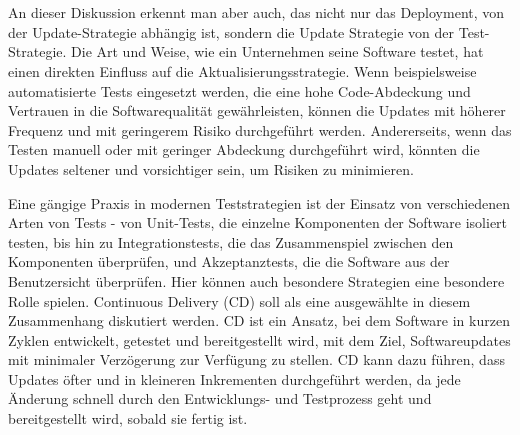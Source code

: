 \\\\ 
An dieser Diskussion erkennt man aber auch, das nicht nur das Deployment, von der Update-Strategie abhängig ist, sondern die Update Strategie von der Test-Strategie. Die Art und Weise, wie ein Unternehmen seine Software testet, hat einen direkten Einfluss auf die Aktualisierungsstrategie. Wenn beispielsweise automatisierte Tests eingesetzt werden, die eine hohe Code-Abdeckung und Vertrauen in die Softwarequalität gewährleisten, können die Updates mit höherer Frequenz und mit geringerem Risiko durchgeführt werden. Andererseits, wenn das Testen manuell oder mit geringer Abdeckung durchgeführt wird, könnten die Updates seltener und vorsichtiger sein, um Risiken zu minimieren.

Eine gängige Praxis in modernen Teststrategien ist der Einsatz von verschiedenen Arten von Tests - von Unit-Tests, die einzelne Komponenten der Software isoliert testen, bis hin zu Integrationstests, die das Zusammenspiel zwischen den Komponenten überprüfen, und Akzeptanztests, die die Software aus der Benutzersicht überprüfen.
Hier können auch besondere Strategien eine besondere Rolle spielen. Continuous Delivery (CD) soll als eine ausgewählte in diesem Zusammenhang diskutiert werden. CD ist ein Ansatz, bei dem Software in kurzen Zyklen entwickelt, getestet und bereitgestellt wird, mit dem Ziel, Softwareupdates mit minimaler Verzögerung zur Verfügung zu stellen. CD kann dazu führen, dass Updates öfter und in kleineren Inkrementen durchgeführt werden, da jede Änderung schnell durch den Entwicklungs- und Testprozess geht und bereitgestellt wird, sobald sie fertig ist.

